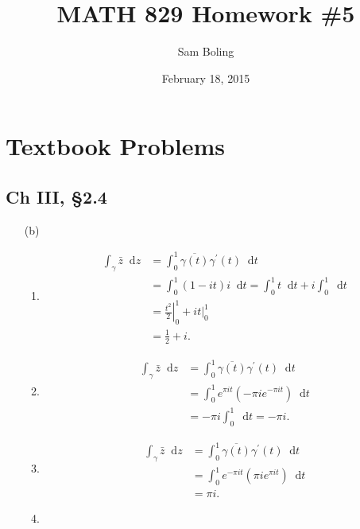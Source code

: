 \documentclass{article}
\title{MATH 829 Homework \#5}
\date{February 18, 2015}
\author{Sam Boling}
\newcommand\dif{\mathop{}\!\mathrm{d}}
\newcounter{Problem}
\begin{document}
\begin{titlepage}
\maketitle
\end{titlepage}

\section{Textbook Problems}

\subsection*{Ch III, \S 2.4}
\begin{itemize}
  \item[(b)]{
    \begin{enumerate}[label=(\alph*)]
      \item{
        \begin{align*}
           \int_\gamma \bar{z} \dif z
        &= \int_0^1 \overline{\gamma(t)} \gamma^\prime(t) \dif t \\
        &= \int_0^1 (1 - it) i \dif t
         = \int_0^1 t \dif t + i \int_0^1 \dif t \\
        &= \left.\frac{t^2}{2}\right|_0^1 + i \left.t\right|_0^1\\
        &= \frac{1}{2} + i.
        \end{align*}
      }
      \item{
        \begin{align*}
           \int_\gamma \bar{z} \dif z
        &= \int_0^1 \overline{\gamma(t)} \gamma^\prime(t) \dif t \\
        &= \int_0^1 e^{\pi i t} (-\pi i e^{-\pi i t}) \dif t \\
        &= -\pi i \int_0^1 \dif t = - \pi i.
        \end{align*}
      }
      \item{
        \begin{align*}
           \int_\gamma \bar{z} \dif z
        &= \int_0^1 \overline{\gamma(t)} \gamma^\prime(t) \dif t \\
        &= \int_0^1 e^{-\pi i t} (\pi i e^{\pi i t}) \dif t \\
        &= \pi i.
        \end{align*}
      }
      \item{
        \begin{align*}

\end{align*}}
\end{enumerate}}
\end{itemize}
\end{document}
